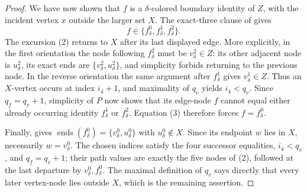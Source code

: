 \begin{proof}
We have now shown that $f$ is a $\delta$-colored boundary identity of
$Z$, with the incident vertex $x$ outside the larger set $X$.  The
exact-three clause of  gives
\[
                    f\in\{f^0_\delta,f^1_\delta,f^2_\delta\}.       \tag{3}
\]
The excursion (2) returns to $X$ after its last displayed edge.  More
explicitly, in the first orientation the node following
$f^2_\delta$ must be $v^2_\delta\in Z$: its other adjacent node is
$u^2_\delta$, its exact ends are
$\{v^2_\delta,u^2_\delta\}$, and simplicity forbids returning to the
previous node.  In the reverse orientation the same argument after
$f^1_\delta$ gives $v^1_\delta\in Z$.  Thus an $X$-vertex occurs at
index $i_4+1$, and maximality of $q_v$ yields $i_4<q_v$.  Since
$q_f=q_v+1$, simplicity of $P$ now shows that its edge-node $f$ cannot
equal either already occurring identity $f^1_\delta$ or
$f^2_\delta$.  Equation (3) therefore forces $f=f^0_\delta$.

Finally,  gives
$\operatorname{ends}(f^0_\delta)=\{v^0_\delta,u^0_\delta\}$ with
$u^0_\delta\notin X$.  Since its endpoint $w$ lies in $X$, necessarily
$w=v^0_\delta$.  The chosen indices satisfy the four successor
equalities, $i_4<q_v$, and $q_f=q_v+1$; their path values are exactly the
five nodes of (2), followed at the last departure by
$v^0_\delta,f^0_\delta$.  The maximal definition of $q_v$ says directly
that every later vertex-node lies outside $X$, which is the remaining
assertion.
\end{proof}
